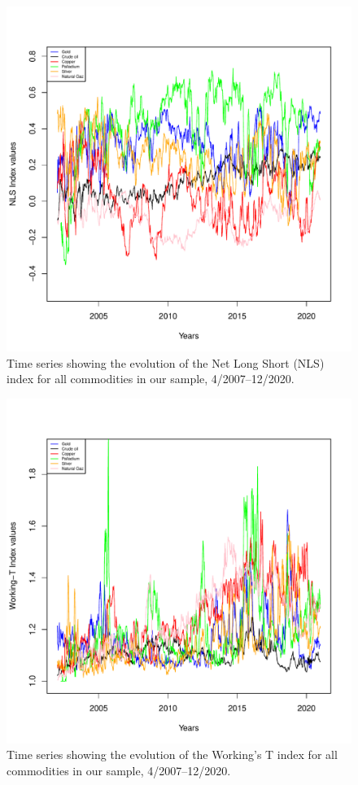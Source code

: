 	\begin{figure}[h]
	\centering
		\includegraphics[scale=0.8]{FIG_NLS}
		\caption{Time series showing the evolution of the Net Long Short (NLS) index for all commodities in our sample, 4/2007--12/2020.}
		\label{fig:NLS}
	\end{figure}

	\begin{figure}[h]
	\centering
		\includegraphics[scale=0.8]{FIG_WT}
		\caption{Time series showing the evolution of the Working's T index for all commodities in our sample, 4/2007--12/2020.}
		\label{fig:WT}
	\end{figure}
	